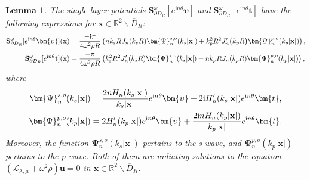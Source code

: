 \documentclass[11pt,reqno,twoside]{amsart}
\newtheorem{lem}{Lemma}[section]
\theoremstyle{definition}
\theoremstyle{remark}
\numberwithin{equation}{section}
\newcommand{\bx}{\mathbf{x}}
\begin{document}
\begin{lem}
	The single-layer potentials $\mathbf{S}_{\partial D_{R}}^{\omega}[e^{\mathrm{i}n\theta}\bm{\upsilon}]$ and $\mathbf{S}_{\partial D_{R}}^{\omega}[e^{\mathrm{i}n\theta}\bm{t}]$ have the following expressions for $\bx\in\mathbb{R}^{2}\backslash\overline{D}_{R}$:
	\begin{align}\label{lem:qninutw}
		\mathbf{S}_{\partial D_{R}}^{\omega}[e^{\mathrm{i}n\theta}\bm{\upsilon }](\mathbf{x})&= \frac{-\mathrm{i}\pi}{4\omega^{2}\rho R}\left(nk_{s}RJ_{n}(k_{s}R)\bm{\Psi}_{n}^{s,o}(k_{s}|\mathbf{x}|)+k_{p}^{2}R^{2}J_{n}^{\prime}\big(k_{p}R\big)\bm{\Psi}_n^{p,o}(k_{p}|\mathbf{x}|)\right), \\
		\mathbf{S}_{\partial D_{R}}^{\omega}[e^{\mathrm{i}n\theta}\mathbf{t}](\mathbf{x})&= \frac{-\pi}{4\omega^{2}\rho R}\left(k_{s}^{2}R^{2}J_{n}^{\prime}(k_{s}R)\bm{\Psi}_{n}^{s,o}(k_{s}|\mathbf{x}|)+nk_{p}RJ_{n}(k_{p}R)\bm{\Psi}_n^{p,o}(k_{p}|\mathbf{x}|)\right), \notag
	\end{align}
	where
	\begin{align}
		\bm{\Psi}_{n}^{s,o}(k_{s}|\mathbf{x}|)&= \frac{2nH_{n}(k_{s}|\mathbf{x}|)}{k_{s}|\mathbf{x}|}e^{\mathrm{i}n\theta}\bm{\upsilon }+2\mathrm{i}H_{n}^{\prime}(k_{s}|\mathbf{x}|)e^{\mathrm{i}n\theta}\bm{t},\label{eq:qp0} \\
		\bm{\Psi}_n^{p,o}(k_p|\mathbf{x}|)&= 2H_{n}^{\prime}(k_{p}|\mathbf{x}|)e^{\mathrm{i}n\theta}\bm{\upsilon}+\frac{2\mathrm{i}nH_{n}(k_{p}|\mathbf{x}|)}{k_{p}|\mathbf{x}|}e^{\mathrm{i}n\theta}\bm{t}. \notag
	\end{align}
	Moreover, the function $\bm{\Psi}_{n}^{s,o}(k_{s}|\mathbf{x}|)$  pertains to the s-wave, and  $\bm{\Psi}_n^{p,o}\left(k_p|\mathbf{x}|\right)$ pertains to the p-wave. Both of them are radiating solutions to the equation $(\mathcal{L}_{\lambda,\mu}+\omega^{2}{\rho} )\mathbf{u}=0$ in $\bx\in\mathbb{R}^{2}\backslash\overline{D}_{R}$.
	

\end{lem}
\end{document}
